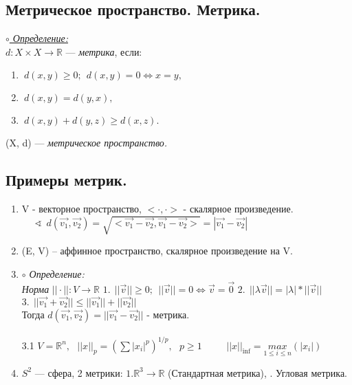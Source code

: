 \documentclass{article}
\begin{document}
 
 \begin{spacing}{1.5}
\newpage
     
    \tableofcontents
    \newpage
\section{Метрическое пространство. Метрика.}
\underline{\textit{$\circ$ Определение:}}\\

  $d: X \times X\rightarrow \mathbb{R}$ --- \emph{\textit{метрика}}, если:
 \begin{enumerate}
\item $~d\left( x, y\right)\geq 0;~~ d\left( x, y\right) = 0\Longleftrightarrow x=y ,$
\item $~d\left( x, y\right)=d\left( y, x\right) ,$
\item $~d\left( x, y\right)+d\left( y, z\right)\geq d(x, z) .$

\end{enumerate}
 (X, d) --- \textit{метрическое пространство.}
 \\
 \subsection{Примеры метрик.}

 \begin{enumerate}
\item V - векторное пространство, $<\cdot , \cdot >$ - скалярное произведение.
 \\$ ~~~~~~\sphericalangle ~~d(\vec{v_{1}}, \vec{v_{2}}) = \sqrt{<\vec{v_{1}} - \vec{v_{2}},\vec{v_{1}} - \vec{v_{2}}> } = |\vec{v_{1}} - \vec{v_{2}}|$
 \item (E, V) -- аффинное пространство, скалярное произведение на V.
 \item \emph{$\circ$ Определение:}\\
 \emph{Норма }$||\cdot||: V\rightarrow  \mathbb{R}$
 \subitem $1. ~~||\vec{v}||\geq 0 ; ~~||\vec{v}|| = 0 \Longleftrightarrow \vec{v} = \vec{0} $
 \subitem $ 2. ~~||\lambda\vec{v}|| = |\lambda|*||\vec{v}|| $
 \subitem $ 3.~~||\vec{v_{1}} + \vec{v_{2}} ||\leq || \vec{v_{1}} || + ||\vec{v_{2}}||$
 \\Тогда $d(\vec{v_{1}}, \vec{v_{2}}) = ||\vec{v_{1}} - \vec{v_{2}}||$ - метрика.
 \\ \\3.1 $V = \mathbb{R}^{n} ,~~~ ||x||_{p} = (\sum |x_{i}|^{p})^{1/p},~~~ p\geq 1$
 \subsubitem $~~~~~~~~~~||x||_{\inf}=\underset{1\leq i\leq n}{max}(|x_{i}|)$
 \item $S^{2}$ --- сфера, 2 метрики:
 \subsubitem $1. \mathbb{R}^{3}\rightarrow \mathbb{R}$ (Стандартная метрика),
 . Угловая метрика.
\end{enumerate}
\end{spacing}
\newpage
\end{document}
